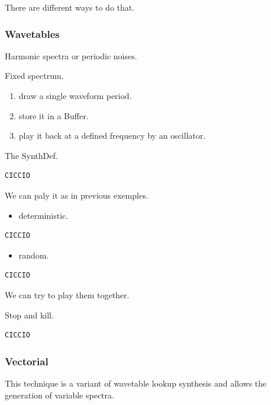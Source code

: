 There are different ways to do that.

\subsubsection{Wavetables}\label{wavetables}

Harmonic spectra or periodic noises.

Fixed spectrum.

\begin{enumerate}
\def\labelenumi{\arabic{enumi}.}
\item draw a single waveform period.
\item store it in a Buffer.
\item play it back at a defined frequency by an oscillator.
\end{enumerate}

The SynthDef.

\begin{lstlisting}[frame=single] 
CICCIO
\end{lstlisting}

We can paly it as in previous exemples.

\begin{itemize}
\tightlist
\item deterministic.
\end{itemize}

\begin{lstlisting}[frame=single] 
CICCIO
\end{lstlisting}

\begin{itemize}
\tightlist
\item random.
\end{itemize}

\begin{lstlisting}[frame=single] 
CICCIO
\end{lstlisting}

We can try to play them together.

Stop and kill.

\begin{lstlisting}[frame=single] 
CICCIO
\end{lstlisting}

\subsubsection{Vectorial}\label{vectorial}

This technique is a variant of wavetable lookup synthesis and allows the generation of variable spectra.

